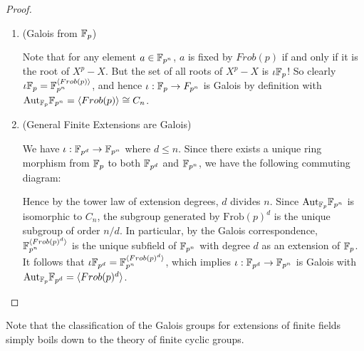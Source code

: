 \documentclass[../book.tex]{subfiles}
\begin{document}
\begin{proof}
\begin{enumerate}
    \item (Galois from $\mathbb{F}_p$)
        
        Note that for any element $a \in \mathbb{F}_{p^n}$,
        $a$ is fixed by $Frob(p)$ if and only if it is the root of $X^p - X$. 
        But the set of all roots of $X^p - X$ is $\iota \mathbb{F}_p$!
        So clearly $\iota \mathbb{F}_p = \mathbb{F}_{p^n}^{\langle Frob(p)\rangle}$,
        and hence $\iota : \mathbb{F}_p \to F_{p^n}$ is Galois by definition 
        with $\mathrm{Aut}_{\mathbb{F}_p}\mathbb{F}_{p^n} = \langle Frob(p)\rangle \cong C_n$.
        
    \item (General Finite Extensions are Galois)
        
        We have $\iota : \mathbb{F}_{p^d} \to \mathbb{F}_{p^n}$ where $d \leq n$.
        Since there exists a unique ring morphism 
        from $\mathbb{F}_p$ to both $\mathbb{F}_{p^d}$ and $\mathbb{F}_{p^n}$, 
        we have the following commuting diagram: \begin{figure}[H]
            \centering
        \end{figure}
        Hence by the tower law of extension degrees, $d$ divides $n$.
        Since $\mathrm{Aut}_{\mathbb{F}_p}\mathbb{F}_{p^n}$ is isomorphic to $C_n$,
        the subgroup generated by $\mathrm{Frob}(p)^d$ 
        is the unique subgroup of order $n / d$.
        In particular, by the Galois correspondence,
        $\mathbb{F}_{p^n}^{\langle Frob(p)^d\rangle}$ is the unique subfield of $\mathbb{F}_{p^n}$ 
        with degree $d$ as an extension of $\mathbb{F}_p$.
        It follows that $\iota \mathbb{F}_{p^d} = \mathbb{F}_{p^n}^{\langle Frob(p)^d\rangle}$, 
        which implies $\iota : \mathbb{F}_{p^d} \to \mathbb{F}_{p^n}$ is Galois
        with $\mathrm{Aut}_{\mathbb{F}_p}\mathbb{F}_{p^d} = \langle Frob(p)^d\rangle$.
        
        
        
    \end{enumerate}        
\end{proof}
\begin{rmk}
    
    Note that the classification of the Galois groups for extensions of finite fields
    simply boils down to the theory of finite cyclic groups. 
    
\end{rmk}
\end{document}
